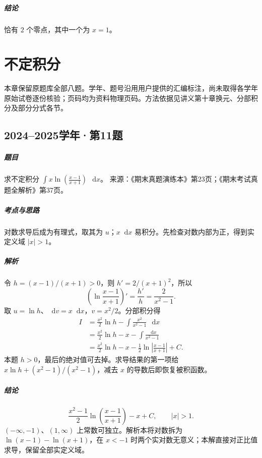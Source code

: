 \documentclass[UTF8,fontset=fandol,12pt,oneside,openany]{ctexrep}
\newcommand{\dd}{\mathop{}\!\mathrm d}
\theoremstyle{definition}
\begin{document}
\paragraph{结论}
恰有 $2$ 个零点，其中一个为 $x=1$。


\chapter{不定积分}
\label{exam:10:chapter}
本章保留原题库全部八题。学年、题号沿用用户提供的汇编标注，尚未取得各学年原始试卷逐份核验；页码均为资料物理页码。方法依据见讲义第十章换元、分部积分及部分分式各节。

\par\addvspace{18pt}\noindent\begin{minipage}{\linewidth}
\section{2024--2025学年·第11题}
\paragraph{题目}求不定积分 $\displaystyle\int x\ln\left(\frac{x-1}{x+1}\right)\,\dd x$。
来源：《期末真题演练本》第23页；《期末考试真题全解析》第37页。
\end{minipage}\par
\paragraph{考点与思路}对数求导后成为有理式，取其为 $u$；$x\dd x$ 易积分。先检查对数内部为正，得到实定义域 $|x|>1$。
\paragraph{解析}令 $h=(x-1)/(x+1)>0$，则 $h'=2/(x+1)^2$，所以
\[
\left(\ln\frac{x-1}{x+1}\right)'=\frac{h'}h=\frac2{x^2-1}.
\]
取 $u=\ln h$、$\dd v=x\dd x$，$v=x^2/2$。分部积分得
\begin{align*}
I&=\frac{x^2}2\ln h-\int\frac{x^2}{x^2-1}\,\dd x\\
&=\frac{x^2}2\ln h-x-\int\frac{\dd x}{x^2-1}\\
&=\frac{x^2}2\ln h-x-\frac12\ln\left|\frac{x-1}{x+1}\right|+C.
\end{align*}
本题 $h>0$，最后的绝对值可去掉。求导结果的第一项给 $x\ln h+(x^2-1)/(x^2-1)$，减去 $x$ 的导数后即恢复被积函数。
\paragraph{结论}
\[
\boxed{\frac{x^2-1}2\ln\left(\frac{x-1}{x+1}\right)-x+C},\qquad |x|>1.
\]
$(-\infty,-1)$、$(1,\infty)$ 上常数可独立。解析本将对数拆为 $\ln(x-1)-\ln(x+1)$，在 $x<-1$ 时两个实对数无意义；本解直接对正比值求导，保留全部实定义域。
\end{document}
